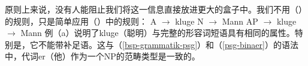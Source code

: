 原则上来说，没有人能阻止我们将这一信息直接放进更大的盒子中。我们不用（）的规则，只是简单应用（）中的规则：
\eal
\ex A $\to$ kluge
\ex N $\to$ Mann
\zl
\eal
\label{Lexikon-Projektion}
\ex AP $\to$ kluge
\ex \nbar $\to$ Mann
\zl
例（a）说明了kluge（聪明）与完整的形容词短语具有相同的属性。特别是，它不能带补足语。这与（\ref{bsp-grammatik-psg}）和（\ref{psg-binaer}）的语法中，代词er（他）作为一个NP的范畴类型是一致的。

